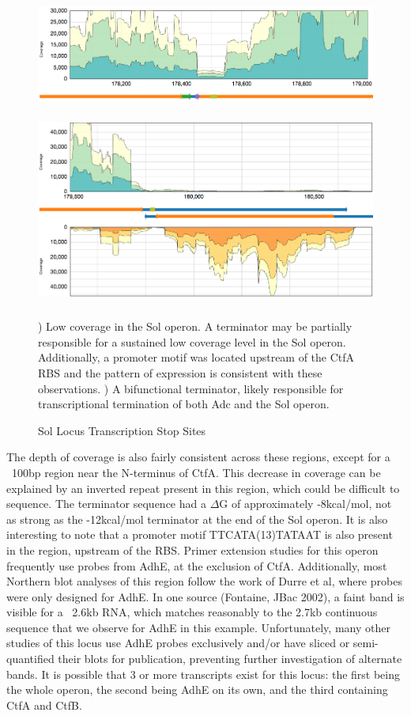 \begin{figure}
{\includegraphics[width=\textwidth,height=1.5in]{images/Assembly/Sol/Sol-AdhE-terminator.png}
\label{fig:3a}}
{\includegraphics[width=\textwidth,height=2.5in]{images/Assembly/Sol/Sol-bifunctional-terminator}
\label{fig:3b}}
\caption{Sol Locus Transcription Stop Sites}
 ) Low coverage in the Sol operon. A terminator may be partially responsible for a sustained low coverage level in the Sol operon. Additionally, a promoter motif was located upstream of the CtfA RBS and the pattern of expression is consistent with these observations. ) A bifunctional terminator, likely responsible for transcriptional termination of both Adc and the Sol operon.
\end{figure}

The depth of coverage is also fairly consistent across these regions, except for a ~100bp region near the N-terminus of CtfA. This decrease in coverage can be explained by an inverted repeat present in this region, which could be difficult to sequence. The terminator sequence had a \(\Delta\)G of approximately -8kcal/mol, not as strong as the -12kcal/mol terminator at the end of the Sol operon. It is also interesting to note that a promoter motif TTCATA(13)TATAAT is also present in the region, upstream of the RBS. Primer extension studies for this operon frequently use probes from AdhE, at the exclusion of CtfA. Additionally, most Northern blot analyses of this region follow the work of Durre et al, where probes were only designed for AdhE. In one source (Fontaine, JBac 2002), a faint band is visible for a ~2.6kb RNA, which matches reasonably to the 2.7kb continuous sequence that we observe for AdhE in this example. Unfortunately, many other studies of this locus use AdhE probes exclusively and/or have sliced or semi-quantified their blots for publication, preventing further investigation of alternate bands. It is possible that 3 or more transcripts exist for this locus: the first being the whole operon, the second being AdhE on its own, and the third containing CtfA and CtfB.

